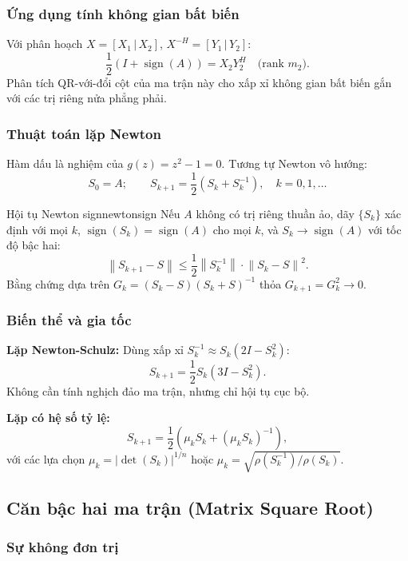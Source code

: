 \documentclass[12pt,a4paper]{report}
\newcommand{\norm}[1]{\left\lVert #1 \right\rVert}
\newcommand{\sign}{\operatorname{sign}}
\begin{document}
\subsubsection{Ứng dụng tính không gian bất biến}

Với phân hoạch $X = [X_1\,|\,X_2]$, $X^{-H} = [Y_1\,|\,Y_2]$:
\[
  \frac{1}{2}(I + \sign(A)) = X_2 Y_2^H \quad \text{(rank $m_2$)}.
\]
Phân tích QR-với-đổi cột của ma trận này cho xấp xỉ không gian bất biến gắn với
các trị riêng nửa phẳng phải.

\subsubsection{Thuật toán lặp Newton}

Hàm dấu là nghiệm của $g(z) = z^2 - 1 = 0$. Tương tự Newton vô hướng:
\[
  S_0 = A; \qquad S_{k+1} = \frac{1}{2}\left(S_k + S_k^{-1}\right), \quad k = 0, 1, \ldots
\]

\begin{theorem}{Hội tụ Newton sign}{newtonsign}
Nếu $A$ không có trị riêng thuần ảo, dãy $\{S_k\}$ xác định với mọi $k$,
$\sign(S_k) = \sign(A)$ cho mọi $k$, và $S_k \to \sign(A)$ với tốc độ bậc hai:
\[
  \norm{S_{k+1} - S} \le \frac{1}{2}\norm{S_k^{-1}} \cdot \norm{S_k - S}^2.
\]
Bằng chứng dựa trên $G_k = (S_k - S)(S_k + S)^{-1}$ thỏa $G_{k+1} = G_k^2 \to 0$.
\end{theorem}

\subsubsection{Biến thể và gia tốc}

\textbf{Lặp Newton-Schulz:} Dùng xấp xỉ $S_k^{-1} \approx S_k(2I - S_k^2)$:
\[
  S_{k+1} = \frac{1}{2} S_k (3I - S_k^2).
\]
Không cần tính nghịch đảo ma trận, nhưng chỉ hội tụ cục bộ.

\textbf{Lặp có hệ số tỷ lệ:}
\[
  S_{k+1} = \frac{1}{2}\left(\mu_k S_k + (\mu_k S_k)^{-1}\right),
\]
với các lựa chọn $\mu_k = |\det(S_k)|^{1/n}$ hoặc $\mu_k = \sqrt{\rho(S_k^{-1})/\rho(S_k)}$.

\subsection{Căn bậc hai ma trận (Matrix Square Root)}

\subsubsection{Sự không đơn trị}
\end{document}
